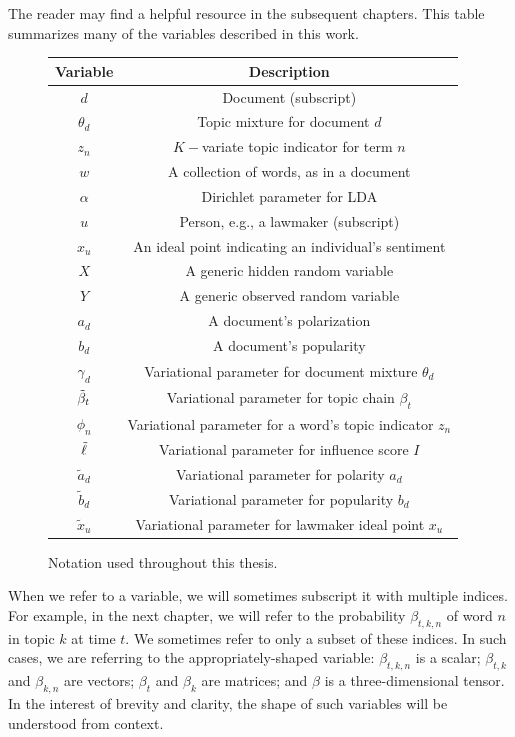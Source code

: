 The reader may find  a helpful resource in the
subsequent chapters.  This table summarizes many of the variables
described in this work.
\begin{figure}
  \caption{Notation used throughout this thesis.}
  \begin{center}
    \begin{tabular}{|c|c|}
      \hline
      \textbf{Variable} & \textbf{Description} \\
      \hline
      $d$ & Document (subscript) \\
      $\theta_d$ & Topic mixture for document $d$ \\
      $z_n$ & $K-$variate topic indicator for term $n$ \\
      $w$ & A collection of words, as in a document \\
      $\alpha$ & Dirichlet parameter for LDA \\
      $u$ & Person, e.g., a lawmaker (subscript) \\
      $x_u$ & An ideal point indicating an individual's sentiment \\
      $X$ & A generic hidden random variable \\
      $Y$ & A generic observed random variable \\
      $a_d$ & A document's polarization \\
      $b_d$ & A document's popularity \\
      \hline
      $\gamma_d$ & Variational parameter for document mixture $\theta_d$ \\
      $\tilde{\beta}_t$ & Variational parameter for topic chain $\beta_t$ \\
      $\phi_n$ & Variational parameter for a word's topic indicator $z_n$ \\
      $\tilde{\ell}$ & Variational parameter for influence score $I$ \\
      $\tilde a_d$ & Variational parameter for polarity $a_d$ \\
      $\tilde b_d$ & Variational parameter for popularity $b_d$ \\
      $\tilde x_u$ & Variational parameter for lawmaker ideal point $x_u$ \\
      \hline
    \end{tabular}
  \end{center}
  \label{table:notation}
\end{figure}
When we refer to a variable, we will sometimes subscript it with
multiple indices.  For example, in the next chapter, we will refer to
the probability $\beta_{t,k,n}$ of word $n$ in topic $k$ at time
$t$. We sometimes refer to only a subset of these indices. In such
cases, we are referring to the appropriately-shaped variable:
$\beta_{t,k,n}$ is a scalar; $\beta_{t,k}$ and $\beta_{k,n}$ are
vectors; $\beta_t$ and $\beta_k$ are matrices; and
$\beta$ is a three-dimensional tensor.  In the interest of brevity and
clarity, the shape of such variables will be understood from context.

